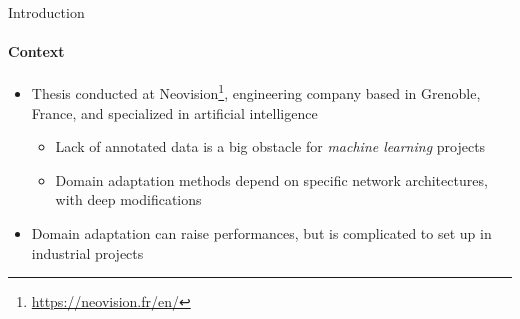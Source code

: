 \documentclass[aspectratio=141]{beamer}
\begin{document}
\begin{frame}{Introduction}
    \framesubtitle{Context}
    
    \begin{itemize}
        \item Thesis conducted at \alert{Neovision}\footnote{\url{https://neovision.fr/en/}}, engineering company based in Grenoble, France, and specialized in artificial intelligence
        \vspace*{2mm}
        \begin{center}
        \end{center}
        \vspace*{2mm}
        \begin{itemize}
            \item Lack of annotated data is a big obstacle for \textit{machine learning} projects
            \item Domain adaptation methods depend on specific network architectures, with deep modifications
        \end{itemize}
        \item[\contour{DEgreen}{$\Rightarrow$}] Domain adaptation can raise performances, but is complicated to set up in industrial projects
    \end{itemize}
\end{frame}
\end{document}
